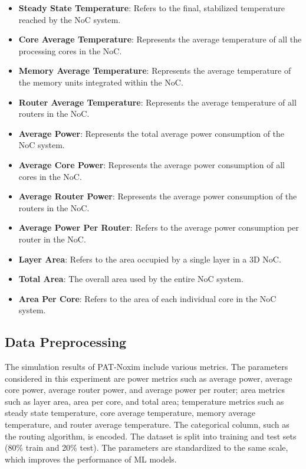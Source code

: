 \documentclass[conference]{IEEEtran}
\begin{document}
	\begin{itemize}
		\item \textbf{Steady State Temperature}: Refers to the final, stabilized temperature reached by the NoC system.
		\item \textbf{Core Average Temperature}: Represents the average temperature of all the processing cores in the NoC.
		\item \textbf{Memory Average Temperature}: Represents the average temperature of the memory units integrated within the NoC.
		\item \textbf{Router Average Temperature}: Represents the average temperature of all routers in the NoC.
		\item \textbf{Average Power}: Represents the total average power consumption of the NoC system.
		\item \textbf{Average Core Power}: Represents the average power consumption of all cores in the NoC.
		\item \textbf{Average Router Power}: Represents the average power consumption of the routers in the NoC.
		\item \textbf{Average Power Per Router}: Refers to the average power consumption per router in the NoC.
		\item \textbf{Layer Area}: Refers to the area occupied by a single layer in a 3D NoC.
		\item \textbf{Total Area}:  The overall area used by the entire NoC system.
		\item \textbf{Area Per Core}: Refers to the area of each individual core in the NoC system.
	\end{itemize} 

	\subsection{Data Preprocessing}
	The simulation results of PAT-Noxim include various metrics. The parameters considered in this experiment are power metrics such as average power, average core power, average router power, and average power per router; area metrics such as layer area, area per core, and total area; temperature metrics such as steady state temperature, core average temperature, memory average temperature, and router average temperature. The categorical column, such as the routing algorithm, is encoded. The dataset is split into training and test sets (80\% train and 20\% test). The parameters are standardized to the same scale, which improves the performance of ML models.
\end{document}
